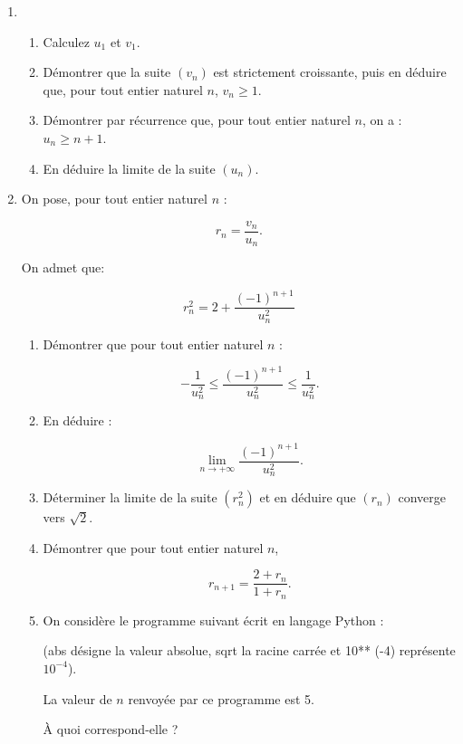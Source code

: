 \documentclass[10pt,a4paper,french]{article}
\begin{document}
\begin{enumerate}
\item
	\begin{enumerate}
		\item Calculez $u_1$ et $v_1$.
		\item Démontrer que la suite $\left(v_n\right)$ est strictement croissante, puis en déduire que, pour tout entier naturel $n$,\: $v_n \geqslant 1$.
		\item Démontrer par récurrence que, pour tout entier naturel $n$, on a : $u_n \geqslant  n + 1$.
		\item En déduire la limite de la suite $\left(u_n\right)$.
	\end{enumerate}
\item On pose, pour tout entier naturel $n$ :

\[r_n = \dfrac{v_n}{u_n}.\]

On admet que:

\[r_n^2 = 2 + \dfrac{(- 1)^{n+1}}{u_n^2}\]

	\begin{enumerate}
		\item Démontrer que pour tout entier naturel $n$ :

\[- \dfrac{1}{u_n^2} \leqslant \dfrac{(- 1)^{n+1}}{u_n^2} \leqslant \dfrac{1}{u_n^2}.\]
		\item En déduire :

\[\displaystyle\lim_{n \to + \infty} \dfrac{(- 1)^{n+1}}{u_n^2}.\]

		\item Déterminer la limite de la suite $\left(r_n^2\right)$ et en déduire que $\left(r_n\right)$ converge vers $\sqrt{2}$.
		\item  Démontrer que pour tout entier naturel $n$,

\[r_{n+1} = \dfrac{2 + r_n}{1 + r_n}.\]

		\item On considère le programme suivant écrit en langage Python :
		
\begin{center}
\end{center}

\smallskip

(abs désigne la valeur absolue, sqrt la racine carrée et 10** (-4) représente $10^{-4}$).

La valeur de $n$ renvoyée par ce programme est 5.

 À quoi correspond-elle ?
	\end{enumerate}
\end{enumerate}
\end{document}
